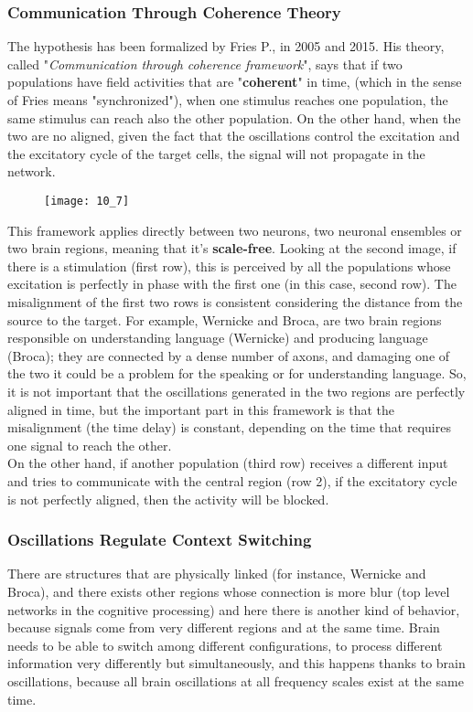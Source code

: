 \subsubsection{Communication Through Coherence Theory}
The hypothesis has been formalized by Fries P., in 2005 and 2015. His theory, called "\textit{Communication through coherence framework}", says that if two populations 
have field activities that are "\textbf{coherent}" in time, (which in the sense of Fries means "synchronized"), when one stimulus reaches one population, the same stimulus 
can reach also the other population. On the other hand, when the two are no aligned, given the fact that the oscillations control the excitation and the excitatory cycle 
of the target cells, the signal will not propagate in the network.
\begin{figure}[H]
    \texttt{[image: 10\_7]}
    \centering
\end{figure}
This framework applies directly between two neurons, two neuronal ensembles or two brain regions, meaning that 
it's \textbf{scale-free}.
Looking at the second image, if there is a stimulation (first row), this is perceived by all the populations whose 
excitation is perfectly in phase with the first one (in this case, second row). The misalignment of the first two rows 
is consistent considering the distance from the source to the target. For example, Wernicke and Broca, are two brain 
regions responsible on understanding language (Wernicke) and producing language (Broca); 
they are connected by a dense number of axons, and damaging one of the two it could be a problem for the speaking or for understanding language. 
So, it is not important that the oscillations generated in the two regions are perfectly aligned in time, but the important part in this framework is 
that the misalignment (the time delay) is constant, depending on the time that requires one signal to reach the other.\\
On the other hand, if another population (third row) receives a different input and tries to communicate with the central region (row 2), if the excitatory cycle is not 
perfectly aligned, then the activity will be blocked.

\subsubsection{Oscillations Regulate Context Switching}
There are structures that are physically linked (for instance, Wernicke and Broca), and there exists other regions whose connection is more blur (top level networks in the 
cognitive processing) and here there is another kind of behavior, because signals come from very different regions and at the same time. Brain needs to be able to switch 
among different configurations, to process different information very differently but simultaneously, and this happens thanks to brain oscillations, because all brain 
oscillations at all frequency scales exist at the same time. 


